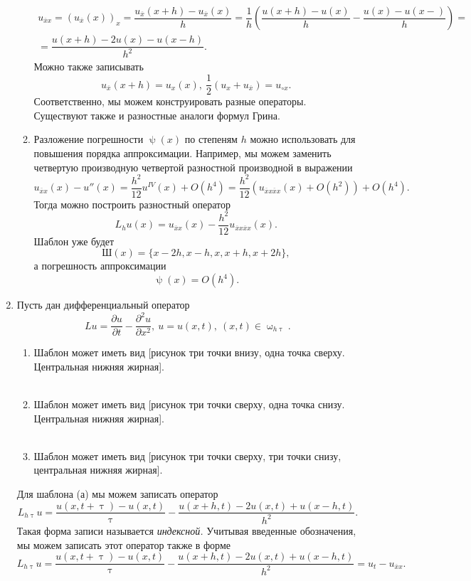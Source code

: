 \documentclass[a4paper, 12pt]{report}
\numberwithin{equation}{section}
\newcommand{\ol}{\overline}
\renewcommand{\tau}{\uptau}
\renewcommand{\psi}{\uppsi}
\renewcommand{\omega}{\upomega}
\renewcommand{\d}{\partial}
\begin{document}
\begin{enumerate}
\begin{enumerate}
			\begin{multline*}
				u_{\ol x x} = (u_{\ol x}(x))_x = \dfrac{u_{\ol x}(x+h) - u_{\ol x}(x)}{h} = \dfrac{1}{h}\left(\dfrac{u(x+h) - u(x)}{h} - \dfrac{u(x) - u(x-)}{h}\right) =\\= \dfrac{u(x+h) - 2u(x) - u(x-h)}{h^2}.
			\end{multline*}
			Можно также записывать $$u_{\ol x}(x+h) = u_x(x),\ \dfrac12 (u_x + u_{\ol x}) = u_{\circ x}.$$ Соответственно, мы можем конструировать разные операторы. Существуют также и разностные аналоги формул Грина.
			\item Разложение погрешности $\psi(x)$ по степеням $h$ можно использовать для повышения порядка аппроксимации. Например, мы можем заменить четвертую производную четвертой разностной производной в выражении $$u_{\ol x x}(x) - u''(x) = \dfrac{h^2}{12} u^{IV}(x) + O(h^4) = \dfrac{h^2}{12}\left(u_{\ol x x\ol x x}(x) + O(h^2)\right) + O(h^4).$$
			Тогда можно построить разностный оператор $$L_hu(x) = u_{\ol x x}(x) - \dfrac{h^2}{12} u_{\ol x x\ol x x}(x).$$
			Шаблон уже будет $$\text{Ш}(x) = \{x-2h, x-h, x, x+h, x+2h\},$$ а погрешность аппроксимации $$\psi(x) = O(h^4).$$
		\end{enumerate}
		\item Пусть дан дифференциальный оператор $$Lu = \dfrac{\d u}{\d t} - \dfrac{\d ^2 u}{\d x ^2},\ u=u(x,t),\ (x,t) \in \omega_{h\tau}.$$
		\begin{enumerate}
			\item Шаблон может иметь вид [рисунок три точки внизу, одна точка сверху. Центральная нижняя жирная].\\\\
			\item Шаблон может иметь вид [рисунок три точки сверху, одна точка снизу. Центральная нижняя жирная].\\\\
			\item Шаблон может иметь вид [рисунок три точки сверху, три точки снизу, центральная нижняя жирная].
		\end{enumerate}
		Для шаблона (а) мы можем записать оператор $$L_{h\tau} u = \dfrac{u(x, t+\tau) - u(x,t)}{\tau} - \dfrac{u(x+h, t) - 2u(x,t) + u(x-h, t)}{h^2}.$$
		Такая форма записи называется \textit{индексной.}
		Учитывая введенные обозначения, мы можем записать этот оператор также в форме 
		\begin{equation}
			L_{h\tau} u = \dfrac{u(x, t+\tau) - u(x,t)}{\tau} - \dfrac{u(x+h, t) - 2u(x,t) + u(x-h, t)}{h^2} = u_t - u_{\ol x x}.

\end{equation}
\end{enumerate}
\end{document}
